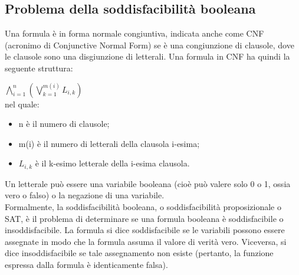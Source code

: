 \documentclass[a4paper,11pt]{article} %
\begin{document}
\subsection{Problema della soddisfacibilità booleana}
Una formula è in forma normale congiuntiva, indicata anche come CNF (acronimo di Conjunctive Normal Form) se è una congiunzione di clausole, dove le clausole sono una disgiunzione di letterali. Una formula in CNF ha quindi la seguente struttura:

${\displaystyle \bigwedge _{i=1}^{n}\left(\bigvee _{k=1}^{m(i)}L_{i,k}\right)}$ \\

nel quale:
\begin{itemize}
	\item n è il numero di clausole;
	\item m(i) è il numero di letterali della clausola i-esima;
	\item $L_{i,k}$ è il k-esimo letterale della i-esima clausola.
\end{itemize}
Un letterale può essere una variabile booleana (cioè può valere solo 0 o 1, ossia vero o falso) o la negazione di una variabile.\\
Formalmente, la soddisfacibilità booleana, o soddisfacibilità proposizionale o SAT, è il problema di determinare se una formula booleana è soddisfacibile o insoddisfacibile. La formula si dice soddisfacibile se le variabili possono essere assegnate in modo che la formula assuma il valore di verità vero. Viceversa, si dice insoddisfacibile se tale assegnamento non esiste (pertanto, la funzione espressa dalla formula è identicamente falsa).
\end{document}
